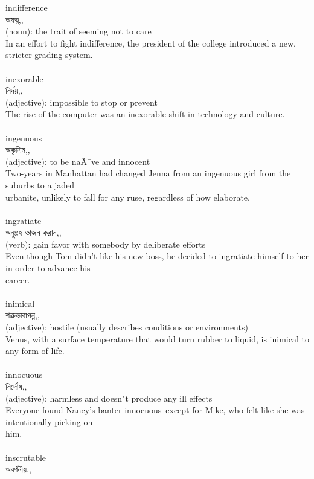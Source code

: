 \documentclass{article}
\begin{document}
{indifference}\\
{অযত্ন,,}\\
{(noun): the trait of seeming not to care\\In an effort to fight indifference, the president of the college introduced a new, stricter grading system.\\}\\
{inexorable}\\
{নির্দয়,,}\\
{(adjective): impossible to stop or prevent\\The rise of the computer was an inexorable shift in technology and culture.\\}\\
{ingenuous}\\
{অকৃত্রিম,,}\\
{(adjective): to be naÃ¯ve and innocent\\Two-years in Manhattan had changed Jenna from an ingenuous girl from the suburbs to a jaded\\urbanite, unlikely to fall for any ruse, regardless of how elaborate.\\}\\
{ingratiate}\\
{অনুগ্রহ ভাজন করান,,}\\
{(verb): gain favor with somebody by deliberate efforts\\Even though Tom didn't like his new boss, he decided to ingratiate himself to her in order to advance his\\career.\\}\\
{inimical}\\
{শত্রুভাবাপন্ন,,}\\
{(adjective): hostile (usually describes conditions or environments)\\Venus, with a surface temperature that would turn rubber to liquid, is inimical to any form of life.\\}\\
{innocuous}\\
{নির্দোষ,,}\\
{(adjective): harmless and doesn"t produce any ill effects\\Everyone found Nancy's banter innocuous--except for Mike, who felt like she was intentionally picking on\\him.\\}\\
{inscrutable}\\
{অবর্ণনীয়,,}\\
\end{document}
